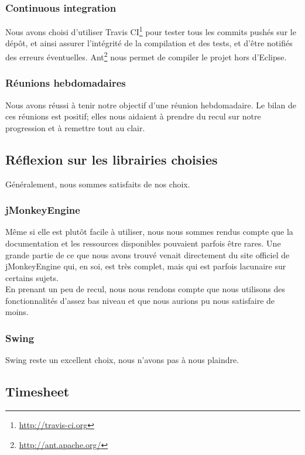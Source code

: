 	\subsubsection{Continuous integration}
	Nous avons choisi d'utiliser Travis CI\footnote{\url{http://travis-ci.org}}
	pour tester tous les commits pushés sur le dépôt, et ainsi assurer
	l'intégrité de la compilation et des tests, et d'être notifiés des erreurs
	éventuelles. Ant\footnote{\url{http://ant.apache.org/}} nous permet de
	compiler le projet hors d'Eclipse.

	\subsubsection{Réunions hebdomadaires}
	Nous avons réussi à tenir notre objectif d'une réunion hebdomadaire. Le 
	bilan de ces réunions est positif; elles nous aidaient à prendre du 
	recul sur notre progression et à remettre tout au clair. 

\subsection{Réflexion sur les librairies choisies}

	Généralement, nous sommes satisfaits de nos choix.

	\subsubsection{jMonkeyEngine}
	Même si elle est plutôt facile à utiliser, nous nous sommes rendus compte
	que la documentation et les ressources disponibles pouvaient parfois être
	rares. Une grande partie de ce que nous avons trouvé venait directement 
	du site officiel de jMonkeyEngine qui, en soi, est très complet, mais qui
	est parfois lacunaire sur certains sujets.\\

	En prenant un peu de recul, nous nous rendons compte que nous utilisons
	des fonctionnalités d'assez bas niveau et que nous aurions pu nous 
	satisfaire de moins.

	\subsubsection{Swing}
	Swing reste un excellent choix, nous n'avons pas à nous plaindre.

\subsection{Timesheet}

